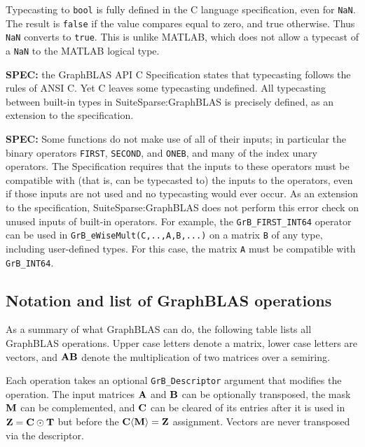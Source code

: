 \documentclass[12pt]{article}
\begin{document}
Typecasting to \verb'bool' is fully defined in the C language specification,
even for \verb'NaN'.  The result is \verb'false' if the value compares equal to
zero, and true otherwise.  Thus \verb'NaN' converts to \verb'true'.  This is
unlike MATLAB, which does not allow a typecast of a \verb'NaN' to the MATLAB
logical type.

\begin{alert}
{\bf SPEC:} the GraphBLAS API C Specification states that typecasting follows
the rules of ANSI C.  Yet C leaves some typecasting undefined.  All typecasting
between built-in types in SuiteSparse:GraphBLAS is precisely defined, as an
extension to the specification.
\end{alert}

\begin{alert}
{\bf SPEC:} Some functions do not make use of all of their inputs; in
particular the binary operators \verb'FIRST', \verb'SECOND', and \verb'ONEB',
and many of the index unary operators.  The Specification requires that the
inputs to these operators must be compatible with (that is, can be typecasted
to) the inputs to the operators, even if those inputs are not used and no
typecasting would ever occur.  As an extension to the specification,
SuiteSparse:GraphBLAS does not perform this error check on unused inputs of
built-in operators.  For example, the \verb'GrB_FIRST_INT64' operator can be
used in \verb'GrB_eWiseMult(C,..,A,B,...)' on a matrix \verb'B' of any type,
including user-defined types.  For this case, the matrix \verb'A' must be
compatible with \verb'GrB_INT64'.
\end{alert}

\subsection{Notation and list of GraphBLAS operations} %
\label{list}

As a summary of what GraphBLAS can do, the following table lists all GraphBLAS
operations.  Upper case letters denote a matrix, lower case letters are
vectors, and ${\bf AB}$ denote the multiplication of two matrices over a
semiring.

Each operation takes an optional \verb'GrB_Descriptor' argument that modifies
the operation.  The input matrices ${\bf A}$ and ${\bf B}$ can be optionally
transposed, the mask ${\bf M}$ can be complemented, and ${\bf C}$ can be
cleared of its entries after it is used in ${\bf Z = C \odot T}$ but before
the ${\bf C \langle M \rangle = Z}$ assignment.
Vectors are never transposed via the descriptor.
\end{document}
